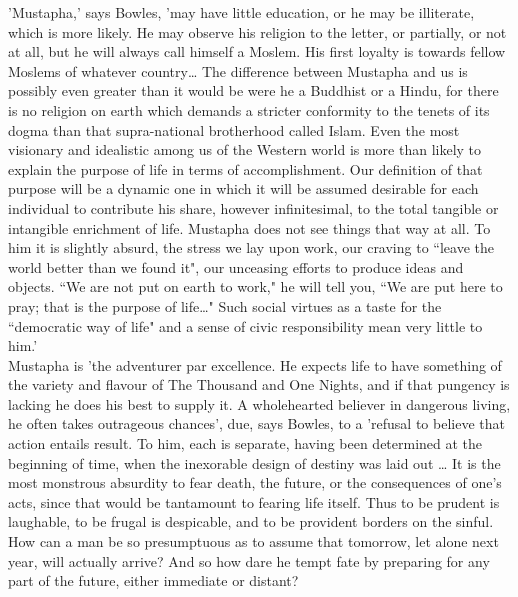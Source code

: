 \documentclass[10pt, twoside]{book}
\begin{document}
'Mustapha,' says Bowles, 'may have little education, or he may be illiterate, which is more likely. He may observe his religion to the letter, or partially, or not at all, but he will always call himself a Moslem. His first loyalty is towards fellow Moslems of whatever country\ldots{} The difference between Mustapha and us is possibly even greater than it would be were he a Buddhist or a Hindu, for there is no religion on earth which demands a stricter conformity to the tenets of its dogma than that supra\hyp{}national brotherhood called Islam. Even the most visionary and idealistic among us of the Western world is more than likely to explain the purpose of life in terms of accomplishment. Our definition of that purpose will be a dynamic one in which it will be assumed desirable for each individual to contribute his share, however infinitesimal, to the total tangible or intangible enrichment of life. Mustapha does not see things that way at all. To him it is slightly absurd, the stress we lay upon work, our craving to ``leave the world better than we found it", our unceasing efforts to produce ideas and objects. ``We are not put on earth to work," he will tell you, ``We are put here to pray; that is the purpose of life\ldots{}" Such social virtues as a taste for the ``democratic way of life" and a sense of civic responsibility mean very little to him.' \\

Mustapha is 'the adventurer par excellence. He expects life to have something of the variety and flavour of The Thousand and One Nights, and if that pungency is lacking he does his best to supply it. A wholehearted believer in dangerous living, he often takes outrageous chances', due, says Bowles, to a 'refusal to believe that action entails result. To him, each is separate, having been determined at the beginning of time, when the inexorable design of destiny was laid out \ldots{} It is the most monstrous absurdity to fear death, the future, or the consequences of one's acts, since that would be tantamount to fearing life itself. Thus to be prudent is laughable, to be frugal is despicable, and to be provident borders on the sinful. How can a man be so presumptuous as to assume that tomorrow, let alone next year, will actually arrive? And so how dare he tempt fate by preparing for any part of the future, either immediate or distant? \\
\end{document}

